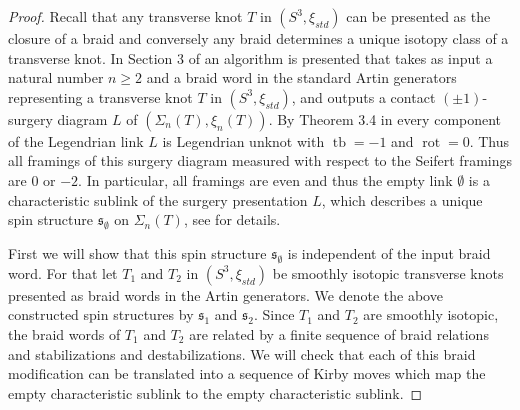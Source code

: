 \documentclass[11pt]{amsart}
\theoremstyle{definition}
\theoremstyle{definition}
\theoremstyle{definition}
\theoremstyle{definition}
\begin{document}
\begin{proof}
    Recall that any transverse knot $T$ in $(S^3,\xi_{std})$ can be presented as the closure of a braid and conversely any braid determines a unique isotopy class of a transverse knot.
    In Section 3 of \cite{Harvey_br_covers} an algorithm is presented that takes as input a natural number $n\geq2$ and a braid word in the standard Artin generators representing a transverse knot $T$ in $(S^3,\xi_{std})$, and outputs a contact $(\pm1)$-surgery diagram $L$ of $(\Sigma_n(T),\xi_n(T))$. By Theorem 3.4 in \cite{Harvey_br_covers} every component of the Legendrian link $L$ is Legendrian unknot with $\operatorname{tb}=-1$ and $\operatorname{rot}=0$. Thus all framings of this surgery diagram measured with respect to the Seifert framings are $0$ or $-2$. In particular, all framings are even and thus the empty link $\emptyset$ is a characteristic sublink of the surgery presentation $L$, which describes a unique spin structure $\mathfrak{s}_{\emptyset}$ on $\Sigma_n(T)$, see \cite{Gompf_Stipsicz} for details.

    First we will show that this spin structure $\mathfrak{s}_\emptyset$ is independent of the input braid word. For that let $T_1$ and $T_2$ in $(S^3,\xi_{std})$ be smoothly isotopic transverse knots presented as braid words in the Artin generators. We denote the above constructed spin structures by $\mathfrak{s}_1$ and $\mathfrak{s}_2$. Since $T_1$ and $T_2$ are smoothly isotopic, the braid words of $T_1$ and $T_2$ are related by a finite sequence of braid relations and stabilizations and destabilizations.  We will check that each of this braid modification can be translated into a sequence of Kirby moves which map the empty characteristic sublink to the empty characteristic sublink.


\end{proof}
\end{document}

